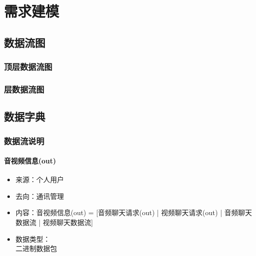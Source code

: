 \chapter{需求建模 }
    \section{数据流图}

        \subsection{顶层数据流图}

        \subsection{层数据流图}

    \section{数据字典}

        \subsection{数据流说明}
            
            \subsubsection{音视频信息(out)}
            \begin{itemize}
                \item 来源：个人用户
                \item 去向：通讯管理
                \item 内容：音视频信息(out) = [音频聊天请求(out) | 视频聊天请求(out) | 音频聊天数据流 | 视频聊天数据流]
                \item 数据类型：\\
                    二进制数据包\\
            \end{itemize}
